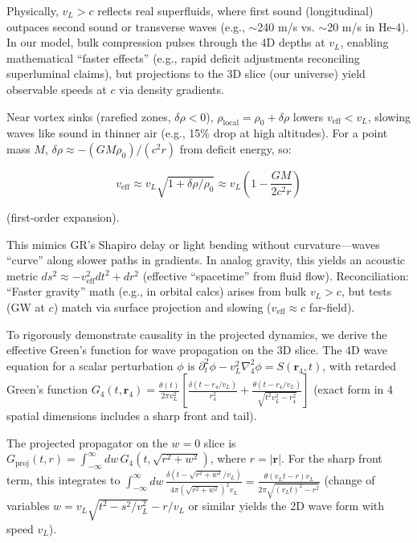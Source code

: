 \documentclass{article}
\begin{document}
Physically, $v_L > c$ reflects real superfluids, where first sound (longitudinal) outpaces second sound or transverse waves (e.g., $\sim$240 m/s vs. $\sim$20 m/s in He-4). In our model, bulk compression pulses through the 4D depths at $v_L$, enabling mathematical ``faster effects'' (e.g., rapid deficit adjustments reconciling superluminal claims), but projections to the 3D slice (our universe) yield observable speeds at $c$ via density gradients.

Near vortex sinks (rarefied zones, $\delta \rho < 0$), $\rho_{\text{local}} = \rho_0 + \delta \rho$ lowers $v_{\text{eff}} < v_L$, slowing waves like sound in thinner air (e.g., 15\% drop at high altitudes). For a point mass $M$, $\delta \rho \approx - (G M \rho_0) / (c^2 r)$ from deficit energy, so:

\[
v_{\text{eff}} \approx v_L \sqrt{1 + \delta \rho / \rho_0} \approx v_L \left(1 - \frac{G M}{2 c^2 r}\right)
\]

(first-order expansion).

This mimics GR's Shapiro delay or light bending without curvature---waves ``curve'' along slower paths in gradients. In analog gravity, this yields an acoustic metric $ds^2 \approx - v_{\text{eff}}^2 dt^2 + dr^2$ (effective ``spacetime'' from fluid flow). Reconciliation: ``Faster gravity'' math (e.g., in orbital calcs) arises from bulk $v_L > c$, but tests (GW at $c$) match via surface projection and slowing ($v_{\text{eff}} \approx c$ far-field).

To rigorously demonstrate causality in the projected dynamics, we derive the effective Green's function for wave propagation on the 3D slice. The 4D wave equation for a scalar perturbation $\phi$ is $\partial_t^2 \phi - v_L^2 \nabla_4^2 \phi = S(\mathbf{r}_4, t)$, with retarded Green's function $G_4(t, \mathbf{r}_4) = \frac{\theta(t)}{2\pi v_L^2} \left[ \frac{\delta(t - r_4 / v_L)}{r_4^2} + \frac{\theta(t - r_4 / v_L)}{\sqrt{t^2 v_L^2 - r_4^2}} \right]$ (exact form in 4 spatial dimensions includes a sharp front and tail).

The projected propagator on the $w=0$ slice is $G_{\text{proj}}(t, r) = \int_{-\infty}^\infty dw \, G_4(t, \sqrt{r^2 + w^2})$, where $r = |\mathbf{r}|$. For the sharp front term, this integrates to $\int_{-\infty}^\infty dw \, \frac{\delta(t - \sqrt{r^2 + w^2} / v_L)}{4\pi (\sqrt{r^2 + w^2})^2 v_L} = \frac{\theta(v_L t - r) v_L}{2\pi \sqrt{(v_L t)^2 - r^2}}$ (change of variables $w = v_L \sqrt{t^2 - s^2 / v_L^2} - r / v_L$ or similar yields the 2D wave form with speed $v_L$).
\end{document}
